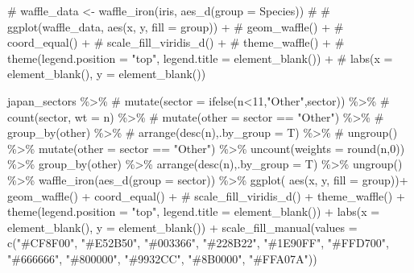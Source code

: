 \documentclass[
  letterpaper,
]{book}
\newenvironment{Shaded}{\begin{snugshade}}{\end{snugshade}}
\newcommand{\AttributeTok}[1]{\textcolor[rgb]{0.40,0.45,0.13}{#1}}
\newcommand{\CommentTok}[1]{\textcolor[rgb]{0.37,0.37,0.37}{#1}}
\newcommand{\DecValTok}[1]{\textcolor[rgb]{0.68,0.00,0.00}{#1}}
\newcommand{\FunctionTok}[1]{\textcolor[rgb]{0.28,0.35,0.67}{#1}}
\newcommand{\NormalTok}[1]{\textcolor[rgb]{0.00,0.23,0.31}{#1}}
\newcommand{\SpecialCharTok}[1]{\textcolor[rgb]{0.37,0.37,0.37}{#1}}
\newcommand{\StringTok}[1]{\textcolor[rgb]{0.13,0.47,0.30}{#1}}
\begin{document}
\begin{Shaded}
\begin{Highlighting}[]
\CommentTok{\# waffle\_data \textless{}{-} waffle\_iron(iris, aes\_d(group = Species))}
\CommentTok{\# }
\CommentTok{\# ggplot(waffle\_data, aes(x, y, fill = group)) + }
\CommentTok{\#   geom\_waffle() + }
\CommentTok{\#   coord\_equal() + }
\CommentTok{\#   scale\_fill\_viridis\_d() + }
\CommentTok{\#   theme\_waffle() +}
\CommentTok{\#   theme(legend.position = "top", legend.title = element\_blank()) +}
\CommentTok{\#   labs(x = element\_blank(), y = element\_blank())}

\NormalTok{japan\_sectors }\SpecialCharTok{\%\textgreater{}\%} 
    \CommentTok{\# mutate(sector = ifelse(n\textless{}11,"Other",sector)) \%\textgreater{}\% }
    \CommentTok{\# count(sector, wt = n) \%\textgreater{}\%}
    \CommentTok{\# mutate(other = sector == "Other") \%\textgreater{}\%}
    \CommentTok{\# group\_by(other) \%\textgreater{}\%}
    \CommentTok{\# arrange(desc(n),.by\_group = T) \%\textgreater{}\%}
    \CommentTok{\# ungroup() \%\textgreater{}\%}
    \FunctionTok{mutate}\NormalTok{(}\AttributeTok{other =}\NormalTok{ sector }\SpecialCharTok{==} \StringTok{"Other"}\NormalTok{) }\SpecialCharTok{\%\textgreater{}\%}
    \FunctionTok{uncount}\NormalTok{(}\AttributeTok{weights =} \FunctionTok{round}\NormalTok{(n,}\DecValTok{0}\NormalTok{)) }\SpecialCharTok{\%\textgreater{}\%} 
    \FunctionTok{group\_by}\NormalTok{(other) }\SpecialCharTok{\%\textgreater{}\%}
    \FunctionTok{arrange}\NormalTok{(}\FunctionTok{desc}\NormalTok{(n),}\AttributeTok{.by\_group =}\NormalTok{ T) }\SpecialCharTok{\%\textgreater{}\%}
    \FunctionTok{ungroup}\NormalTok{() }\SpecialCharTok{\%\textgreater{}\%}
    \FunctionTok{waffle\_iron}\NormalTok{(}\FunctionTok{aes\_d}\NormalTok{(}\AttributeTok{group =}\NormalTok{ sector)) }\SpecialCharTok{\%\textgreater{}\%}
    \FunctionTok{ggplot}\NormalTok{( }\FunctionTok{aes}\NormalTok{(x, y, }\AttributeTok{fill =}\NormalTok{ group))}\SpecialCharTok{+} \FunctionTok{geom\_waffle}\NormalTok{() }\SpecialCharTok{+} \FunctionTok{coord\_equal}\NormalTok{() }\SpecialCharTok{+} 
    \CommentTok{\# scale\_fill\_viridis\_d() + }
    \FunctionTok{theme\_waffle}\NormalTok{() }\SpecialCharTok{+}
    \FunctionTok{theme}\NormalTok{(}\AttributeTok{legend.position =} \StringTok{"top"}\NormalTok{, }\AttributeTok{legend.title =} \FunctionTok{element\_blank}\NormalTok{()) }\SpecialCharTok{+}
    \FunctionTok{labs}\NormalTok{(}\AttributeTok{x =} \FunctionTok{element\_blank}\NormalTok{(), }\AttributeTok{y =} \FunctionTok{element\_blank}\NormalTok{()) }\SpecialCharTok{+}
    \FunctionTok{scale\_fill\_manual}\NormalTok{(}\AttributeTok{values =} \FunctionTok{c}\NormalTok{(}\StringTok{"\#CF8F00"}\NormalTok{, }\StringTok{"\#E52B50"}\NormalTok{, }\StringTok{"\#003366"}\NormalTok{, }\StringTok{"\#228B22"}\NormalTok{, }\StringTok{"\#1E90FF"}\NormalTok{, }\StringTok{"\#FFD700"}\NormalTok{, }\StringTok{"\#666666"}\NormalTok{, }\StringTok{"\#800000"}\NormalTok{, }\StringTok{"\#9932CC"}\NormalTok{, }\StringTok{"\#8B0000"}\NormalTok{, }\StringTok{"\#FFA07A"}\NormalTok{))}
\end{Highlighting}
\end{Shaded}
\end{document}

